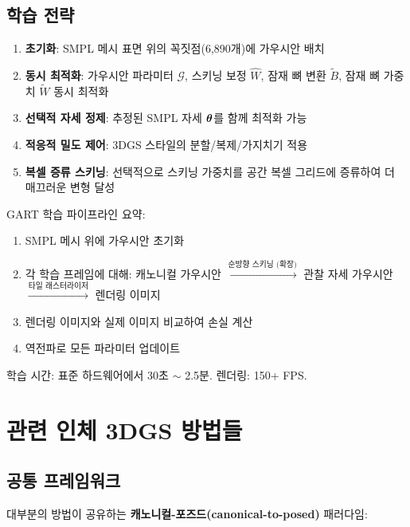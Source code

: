 \documentclass[11pt, a4paper]{report}
\begin{document}
\section{학습 전략}
\label{sec:gart_training}

\begin{enumerate}[leftmargin=*]
  \item \textbf{초기화}: SMPL 메시 표면 위의 꼭짓점(6,890개)에 가우시안 배치
  \item \textbf{동시 최적화}: 가우시안 파라미터 $\mathcal{G}$, 스키닝 보정 $\hat{W}$, 잠재 뼈 변환 $\tilde{B}$, 잠재 뼈 가중치 $\tilde{W}$ 동시 최적화
  \item \textbf{선택적 자세 정제}: 추정된 SMPL 자세 $\bm{\theta}$를 함께 최적화 가능
  \item \textbf{적응적 밀도 제어}: 3DGS 스타일의 분할/복제/가지치기 적용
  \item \textbf{복셀 증류 스키닝}: 선택적으로 스키닝 가중치를 공간 복셀 그리드에 증류하여 더 매끄러운 변형 달성
\end{enumerate}

\begin{summary}
GART 학습 파이프라인 요약:
\begin{enumerate}[leftmargin=*]
  \item SMPL 메시 위에 가우시안 초기화
  \item 각 학습 프레임에 대해: 캐노니컬 가우시안 $\xrightarrow{\text{순방향 스키닝 (확장)}}$ 관찰 자세 가우시안 $\xrightarrow{\text{타일 래스터라이저}}$ 렌더링 이미지
  \item 렌더링 이미지와 실제 이미지 비교하여 손실 계산
  \item 역전파로 모든 파라미터 업데이트
\end{enumerate}
학습 시간: 표준 하드웨어에서 30초 $\sim$ 2.5분. 렌더링: 150+ FPS.
\end{summary}


\chapter{관련 인체 3DGS 방법들}
\label{ch:related}

\section{공통 프레임워크}

대부분의 방법이 공유하는 \textbf{캐노니컬-포즈드(canonical-to-posed)} 패러다임:
\end{document}

